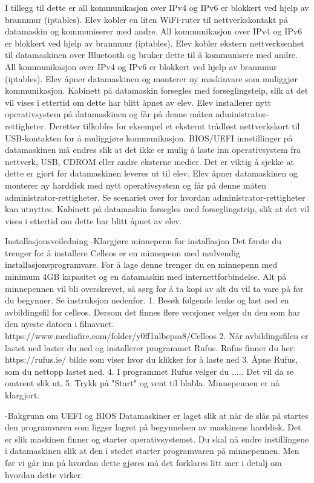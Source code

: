 I tillegg til dette er all kommunikasjon over IPv4 og IPv6 er blokkert ved hjelp av brannmur (iptables).
Elev kobler en liten WiFi-ruter til nettverkskontakt på datamaskin og kommuniserer med andre.	All kommunikasjon over IPv4 og IPv6 er blokkert ved hjelp av brannmur (iptables).
Elev kobler ekstern nettverksenhet til datamaskinen over Bluetooth og bruker dette til å kommunisere med andre.	All kommunikasjon over IPv4 og IPv6 er blokkert ved hjelp av brannmur (iptables).
Elev åpner datamaskinen og monterer ny maskinvare som muliggjør kommunikasjon.	Kabinett på datamaskin forsegles med forseglingsteip, slik at det vil vises i ettertid om dette har blitt åpnet av elev.
Elev installerer nytt operativsystem på datamaskinen og får på denne måten administrator-rettigheter. Deretter tilkobles for eksempel et eksternt trådløst nettverkskort til USB-kontakten for å muliggjøre kommunikasjon.	BIOS/UEFI innstillinger på datamaskinen må endres slik at det ikke er mulig å laste inn operativsystem fra nettverk, USB, CDROM eller andre eksterne medier. Det er viktig å sjekke at dette er gjort før datamaskinen leveres ut til elev.
Elev åpner datamaskinen og monterer ny harddisk med nytt operativsystem og får på denne måten administrator-rettigheter. Se scenariet over for hvordan administrator-rettigheter kan utnyttes.	Kabinett på datamaskin forsegles med forseglingsteip, slik at det vil vises i ettertid om dette har blitt åpnet av elev.



Installasjonsveiledning
-Klargjøre minnepenn for installasjon
Det første du trenger for å installere Celleos er en minnepenn med nødvendig installasjonsprogramvare. For å lage denne trenger du en minnepenn med minimum 4GB kapasitet og en datamaskin med internettforbindelse. Alt på minnepennen vil bli overskrevet, så sørg for å ta kopi av alt du vil ta vare på før du begynner. Se instruksjon nedenfor.
1. Besøk følgende lenke og last ned en avbildingsfil for celleos. Dersom det finnes flere versjoner velger du den som har den nyeste datoen i filnavnet.
https://www.mediafire.com/folder/y0ff1nlbepsa8/Celleos
2. Når avbildingsfilen er lastet ned laster du ned og installerer programmet Rufus. Rufus finner du her:
https://rufus.ie/
bilde som viser hvor du klikker for å laste ned
3. Åpne Rufus, som du nettopp lastet ned.
4. I programmet Rufus velger du .....
Det vil da se omtrent slik ut.
5. Trykk på "Start" og vent til blabla. Minnepennen er nå klargjort.

-Bakgrunn om UEFI og BIOS
Datamaskiner er laget slik at når de slås på startes den programvaren som ligger lagret på begynnelsen av maskinens harddisk. Det er slik maskinen finner og starter operativsystemet. Du skal nå endre instillingene i datamaskinen slik at den i stedet starter programvaren på minnepennen. Men før vi går inn på hvordan dette gjøres må det forklares litt mer i detalj om hvordan dette virker.

